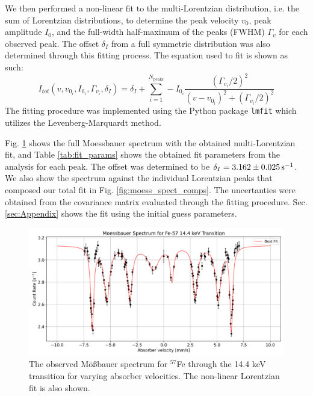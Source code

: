 \documentclass[a4paper]{report}
\numberwithin{equation}{section}
\begin{document}
We then performed a non-linear fit to the multi-Lorentzian distribution, i.e. the sum of Lorentzian
distributions, to determine the peak velocity $v_0$, peak amplitude $I_0$, and the full-width half-maximum of the peaks (FWHM) $\Gamma_v$ for each observed peak. The 
offset $\delta_I$ from a full symmetric distribution was also determined through this fitting process. The equation used to fit
is shown as such:
\begin{equation}
    I_{tot}(v, v_{0_i}, I_{0_i}, \Gamma_{v_i}, \delta_I) = \delta_I + \sum \limits_{i=1}^{N_{\mathrm{peaks}}} - I_{0_i} \frac{(\Gamma_{v_i} / 2)^2}{(v - v_{0_i})^2 + (\Gamma_{v_i} / 2)^2}
    \label{eq:multi_lorentzian}
\end{equation}
The fitting procedure was implemented using the Python package \texttt{lmfit} which utilizes the Levenberg-Marquardt method. 

Fig. \ref{fig:moess_spect} shows the full Moessbauer spectrum with the obtained multi-Lorentzian fit, and Table \ref{tab:fit_params} shows the obtained fit parameters from the analysis for each peak.
The offset was determined to be $\delta_I = \SI{3.162 \pm 0.025}{\per\second} $. We also show the spectrum against the individual Lorentzian
peaks that composed our total fit in Fig. \ref{fig:moess_spect_comps}. The uncertanties were obtained from the 
covariance matrix evaluated through the fitting procedure. Sec. \ref{sec:Appendix} shows the fit using the initial guess parameters. \par 

\begin{figure}[htb!]
	\centering
	\includegraphics[width=0.8\columnwidth]{moess_spect.png}
	\caption{The observed M\"o{\ss}bauer spectrum for $^{57}$Fe through the 14.4 keV transition for varying absorber velocities. The 
	non-linear Lorentzian fit is also shown.}
	\label{fig:moess_spect}
\end{figure}
\end{document}
